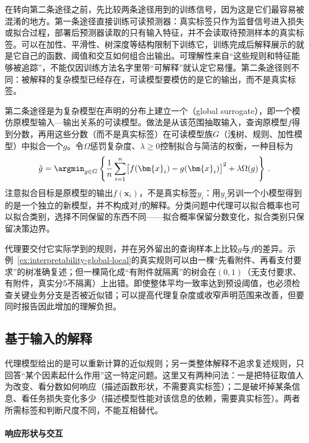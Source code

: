 在转向第二条途径之前，先比较两条途径用到的训练信号，因为这是它们最容易被混淆的地方。第一条途径直接训练可读预测器：真实标签只作为监督信号进入损失或拟合过程，部署后预测器读取的只有输入特征，并不会读取待预测样本的真实标签。可以在加性、平滑性、树深度等结构限制下训练它，训练完成后解释展示的就是它自己的函数、阈值和交互如何组合出输出。可理解性来自“这些规则和特征能够被追踪”，不能仅因训练方法名字里带“可解释”就认定它易懂。第二条途径则不同：被解释的复杂模型已经存在，可读模型要模仿的是它的输出，而不是真实标签。

第二条途径是为复杂模型在声明的分布上建立一个（global surrogate），即一个模仿原模型输入—输出关系的可读模型。做法是从该范围抽取输入，查询原模型$f$得到分数，再用这些分数（而不是真实标签）在可读模型族$G$（浅树、规则、加性模型）中拟合一个$g$。令$\Omega$惩罚复杂度、$\lambda\geq0$控制拟合与简洁的权衡，一种目标为
\begin{equation}
 \hat g=\argmin_{g\in G}\left\{
 \frac1n\sum_{i=1}^n\bigl[f(\bm{x}_i)-g(\bm{x}_i)\bigr]^2
 +\lambda\Omega(g)\right\}\, .
 \label{eq:interpretability-global-surrogate}
\end{equation}
注意拟合目标是原模型的输出$f(\bm x_i)$，不是真实标签$y_i$：用$y_i$另训一个小模型得到的是一个独立的新模型，并不构成对$f$的解释。分类问题中代理可以拟合概率也可以拟合类别，选择不同保留的东西不同——拟合概率保留分数变化，拟合类别只保留决策边界。

代理要交付它实际学到的规则，并在另外留出的查询样本上比较$g$与$f$的差异。示例~\ref{ex:interpretability-global-local}的真实规则可以由一棵“先看附件、再看支付要求”的树准确复述；但一棵简化成“有附件就隔离”的树会在$(0,1)$（无支付要求、有附件，真实分5不隔离）上出错。即使整体平均一致率达到预设阈值，也必须检查关键业务分支是否被近似错；可以提高代理复杂度或收窄声明范围来改善，但要同时报告因此增加的理解负担。

\subsection{基于输入的解释}
\label{sec:interpretability-global-dependence}

代理模型给出的是可以重新计算的近似规则；另一类整体解释不追求复述规则，只回答“某个因素起什么作用”这一特定问题。这里又有两种问法：一是把特征取值人为改变、看分数如何响应（描述函数形状，不需要真实标签）；二是破坏掉某条信息、看任务损失变化多少（描述模型性能对该信息的依赖，需要真实标签）。两者所需标签和判断尺度不同，不能互相替代。

\paragraph{响应形状与交互}

